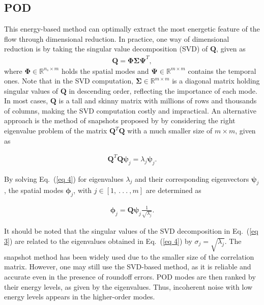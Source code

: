 \documentclass[a4paper,fleqn]{cas-sc}
\begin{document}
	\subsection{POD}
	\label{POD}
	
	This energy-based method can optimally extract the most energetic feature of the flow through dimensional reduction. In practice, one way of dimensional reduction is by taking the singular value decomposition (SVD) of $\mathbf{Q}$, given as
	\begin{align}
		\mathbf{Q} = \mathbf{\Phi} \mathbf{\Sigma} \mathbf{\Psi}^T ,\label{eq 3}
	\end{align}
	\noindent where $\mathbf{\Phi} \in \mathbb{R}^{n_s\times m}$ holds the spatial modes and $\mathbf{\Psi}\in \mathbb{R}^{m\times m}$ contains the temporal ones. Note that in the SVD computation, $\mathbf{\Sigma}\in \mathbb{R}^{m\times m}$ is a diagonal matrix holding singular values of $\mathbf{Q}$ in descending order, reflecting the importance of each mode. In most cases, $\mathbf{Q}$ is a tall and skinny matrix with millions of rows and thousands of columns, making the SVD computation costly and impractical. An alternative approach is the method of snapshots proposed by \citet{Sirovich1987} by considering the right eigenvalue problem of the matrix $\mathbf{Q}^T\mathbf{Q}$ with a much smaller size of $m\times m$, given as 
	
	\begin{align}
		\mathbf{Q}^T\mathbf{Q}\boldsymbol{\psi} _j = \lambda _j \boldsymbol{\psi} _j.\label{eq 4}
	\end{align}
	
	\noindent By solving Eq.~(\ref{eq 4}) for eigenvalues $\lambda _j$ and their corresponding eigenvectors $\boldsymbol{\psi} _j$, the spatial modes $\boldsymbol{\phi} _j$, with $j\in [1,~.~.~.~, m]$ are determined as
	
	\begin{align}
		\boldsymbol{\phi} _j = \mathbf{Q} \boldsymbol{\psi} _j \frac{1}{\sqrt{\lambda _j}}.\label{eq 5}
	\end{align}
	
	\noindent It should be noted that the singular values of the SVD decomposition in Eq.~(\ref{eq 3}) are related to the eigenvalues obtained in Eq.~(\ref{eq 4}) by $\sigma_j = \sqrt{\lambda_j}$. The snapshot method has been widely used due to the smaller size of the correlation matrix. However, one may still use the SVD-based method, as it is reliable and accurate even in the presence of roundoff errors. POD modes are then ranked by their energy levels, as given by the eigenvalues. Thus, incoherent noise with low energy levels appears in the higher-order modes.
	
\end{document}
